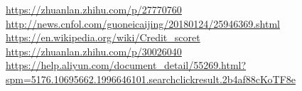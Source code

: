 \documentclass{mcmthesis}
\begin{document}

\begin{thebibliography}{99}
\url{https://zhuanlan.zhihu.com/p/27770760}
\url{http://news.cnfol.com/guoneicaijing/20180124/25946369.shtml}
\url{https://en.wikipedia.org/wiki/Credit_scoret}
\url{https://zhuanlan.zhihu.com/p/30026040}
\url{https://help.aliyun.com/document_detail/55269.html?spm=5176.10695662.1996646101.searchclickresult.2b4af88cKoTF8e
}
\end{thebibliography}
\end{document}
